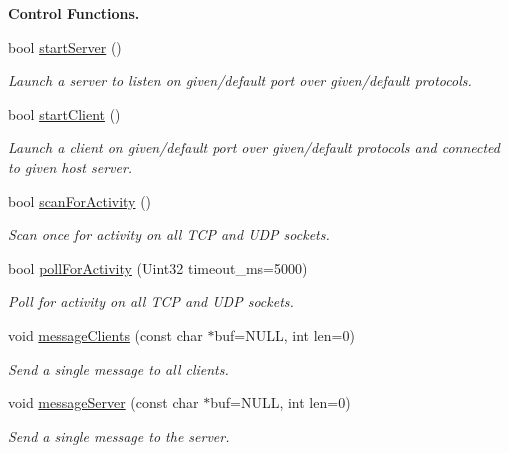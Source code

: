 \begin{Indent}{\bf Control Functions.}\par
\begin{DoxyCompactItemize}
\item 
bool \hyperlink{classNetManager_ae6a832ed2ede5f5407b75abc584269b8}{start\-Server} ()
\begin{DoxyCompactList}\small\item\em Launch a server to listen on given/default port over given/default protocols. \end{DoxyCompactList}\item 
bool \hyperlink{classNetManager_ab5b2ae812e37abbb03be5b604e34a60d}{start\-Client} ()
\begin{DoxyCompactList}\small\item\em Launch a client on given/default port over given/default protocols and connected to given host server. \end{DoxyCompactList}\item 
bool \hyperlink{classNetManager_a934ebfd8ca745a95263ba92c2ccf2b19}{scan\-For\-Activity} ()
\begin{DoxyCompactList}\small\item\em Scan once for activity on all T\-C\-P and U\-D\-P sockets. \end{DoxyCompactList}\item 
bool \hyperlink{classNetManager_ac213dda2e72556e53450d5b1e2057f22}{poll\-For\-Activity} (Uint32 timeout\-\_\-ms=5000)
\begin{DoxyCompactList}\small\item\em Poll for activity on all T\-C\-P and U\-D\-P sockets. \end{DoxyCompactList}\item 
void \hyperlink{classNetManager_a9cd49a87e94f25467cc8056e33c23dc5}{message\-Clients} (const char $\ast$buf=N\-U\-L\-L, int len=0)
\begin{DoxyCompactList}\small\item\em Send a single message to all clients. \end{DoxyCompactList}\item 
void \hyperlink{classNetManager_a83862646172bbdcdbe4174de25837ffd}{message\-Server} (const char $\ast$buf=N\-U\-L\-L, int len=0)
\begin{DoxyCompactList}\small\item\em Send a single message to the server. \end{DoxyCompactList}\item 

\end{DoxyCompactItemize}
\end{Indent}
